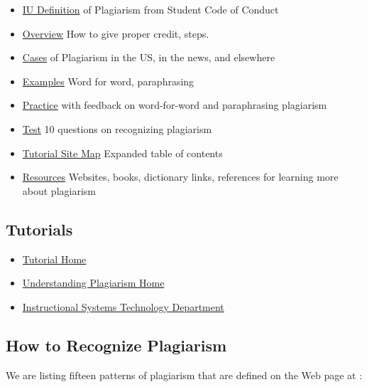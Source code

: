 \begin{itemize}
\item
  \href{https://www.indiana.edu/~istd/definition.html}{IU Definition} of
  Plagiarism from Student Code of Conduct
\item
  \href{https://www.indiana.edu/~istd/overview.html}{Overview} How to
  give proper credit, steps.
\item
  \href{https://www.indiana.edu/~istd/cases.html}{Cases} of Plagiarism
  in the US, in the news, and elsewhere
\item
  \href{https://www.indiana.edu/~istd/examples.html}{Examples} Word for
  word, paraphrasing
\item
  \href{https://www.indiana.edu/~istd/practice.html}{Practice} with
  feedback on word-for-word and paraphrasing plagiarism
\item
  \href{https://www.indiana.edu/~istd/test.html}{Test} 10 questions on
  recognizing plagiarism
\item
  \href{https://www.indiana.edu/~istd/sitemap.html}{Tutorial Site Map}
  Expanded table of contents
\item
  \href{https://www.indiana.edu/~istd/resources.html}{Resources}
  Websites, books, dictionary links, references for learning more about
  plagiarism
\end{itemize}

\subsection{Tutorials}

\begin{itemize}
\item
  \href{https://www.indiana.edu/~academy/firstPrinciples/choice.html}{Tutorial
  Home}
\item
  \href{https://www.indiana.edu/~tedfrick/plagiarism/}{Understanding
  Plagiarism Home}
\item
  \href{http://education.indiana.edu/graduate/programs/instructional-systems/index.html}{Instructional
  Systems Technology Department}
\end{itemize}

\subsection{How to Recognize Plagiarism}

We are listing fifteen patterns of plagiarism that are defined on the Web
page at \cite{}:

